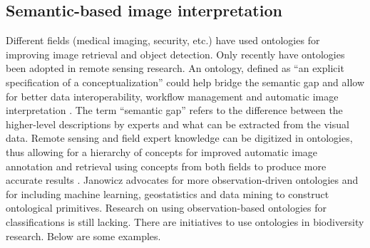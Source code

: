 \documentclass[a4paper,12pt]{article}
\begin{document}
\subsection{Semantic-based image interpretation}
Different fields (medical imaging, security, etc.) have used ontologies for
improving image retrieval and object detection. Only recently have ontologies
been adopted in remote sensing research. An ontology, defined as ``an explicit
specification of a conceptualization'' \cite{gruber1993} could help bridge the
semantic gap and allow for better data interoperability, workflow management and
automatic image interpretation \cite{Arvor2013} \cite{Andres2013a}. The term
``semantic gap'' refers to the difference between the higher-level descriptions
by experts and what can be extracted from the visual data. Remote sensing and
field expert knowledge can be digitized in ontologies, thus allowing for a
hierarchy of concepts for improved automatic image annotation and retrieval
using concepts from both fields to produce more accurate results
\cite{Srikanth:2005:EOA:1076034.1076128}. Janowicz \cite{Janowicz2012}
advocates for more observation-driven ontologies and for including machine
learning, geostatistics and data mining to construct ontological primitives.
Research on using observation-based ontologies for classifications is still
lacking. There are initiatives to use ontologies in biodiversity research. Below
are some examples.
\end{document}
